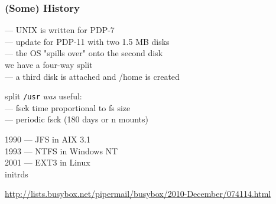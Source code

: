 \documentclass[]{beamer}
\newcommand\pp\pause
\begin{document}
\begin{frame}
  \frametitle{(Some) History}

  \pp
  1969 — \textsc{\small UNIX} is written for PDP-7\\
  \pp
  1971 — update for PDP-11 with two 1.5 MB disks\\
  \pp
  \phantom{1670} — the OS "spills over" onto the second disk\\
  \phantom{1670 —} we have a four-way split\\
  \pp
  \phantom{1670} — a third disk is attached and /home is created\\
  \pp

  split \texttt{/usr} \textit{was} useful:\\
  \pp
  \phantom{1670} — fsck time proportional to fs size\\
  \phantom{1670} — periodic fsck (180 days or n mounts)\\
  \pp

  1990 — JFS in AIX 3.1\\
  1993 — NTFS in Windows NT\\
  2001 — EXT3 in Linux\\

  \pp
  initrds

  \vfill

  \tiny
  \url{http://lists.busybox.net/pipermail/busybox/2010-December/074114.html}\vspace{-5em}
\end{frame}
\end{document}

